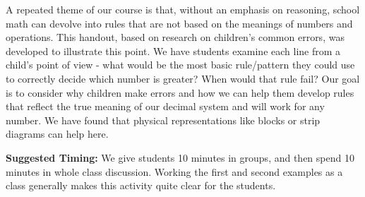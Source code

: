 \documentclass{ximera}
\begin{document}
\newpage
\begin{instructorNotes}
A repeated theme of our course is that, without an emphasis on reasoning, school math can devolve into rules that are not based on the meanings of numbers and operations.  This handout, based on research on children's common errors, was developed to illustrate this point.  We have students examine each line from a child's point of view - what would be the most basic rule/pattern they could use to correctly decide which number is greater? When would that rule fail? Our goal is to consider why children make errors and how we can help them develop rules that reflect the true meaning of our decimal system and will work for any number.  We have found that physical representations like blocks or strip diagrams can help here.


{\bf Suggested Timing:} We give students 10 minutes in groups, and then spend 10 minutes in whole class discussion.  Working the first and second examples as a class generally makes this activity quite clear for the students.
\end{instructorNotes}
\end{document}

